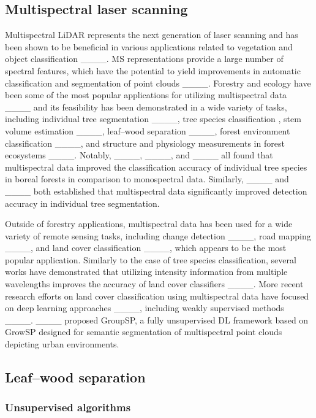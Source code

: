 \subsection{Multispectral laser scanning}

Multispectral LiDAR represents the next generation of laser scanning and has been shown to be beneficial in various applications related to vegetation and object classification ____. MS representations provide a large number of spectral features, which have the potential to yield improvements in automatic classification and segmentation of point clouds ____. Forestry and ecology have been some of the most popular applications for utilizing multispectral data ____ and its feasibility has been demonstrated in a wide variety of tasks, including individual tree segmentation ____, tree species classification \cite[see e.g][]{yu2017single,budei2018identifying,lindeberg2021classification}, stem volume estimation ____, leaf--wood separation ____, forest environment classification ____, and structure and physiology measurements in forest ecosystems ____. Notably, ____, ____, and ____ all found that multispectral data improved the classification accuracy of individual tree species in boreal forests in comparison to monospectral data. Similarly, ____ and ____ both established that multispectral data significantly improved detection accuracy in individual tree segmentation.

Outside of forestry applications, multispectral data has been used for a wide variety of remote sensing tasks, including change detection ____, road mapping ____, and land cover classification ____, which appears to be the most popular application. Similarly to the case of tree species classification, several works have demonstrated that utilizing intensity information from multiple wavelengths improves the accuracy of land cover classifiers ____. More recent research efforts on land cover classification using multispectral data have focused on deep learning approaches ____, including weakly supervised methods ____. ____ proposed GroupSP, a fully unsupervised DL framework based on GrowSP designed for semantic segmentation of multispectral point clouds depicting urban environments.

\subsection{Leaf--wood separation}

\subsubsection{Unsupervised algorithms}

